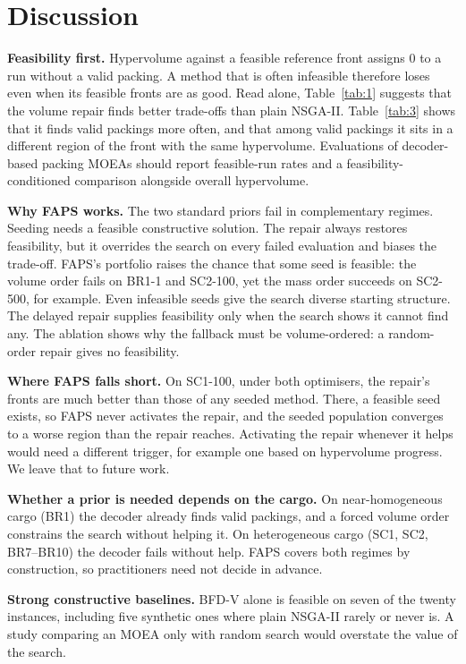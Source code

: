 \documentclass[journal]{IEEEtran}
\begin{document}
\section{Discussion}\label{sec:7}

\textbf{Feasibility first.} Hypervolume against a feasible reference front assigns 0 to a run without a valid packing. A method that is often infeasible therefore loses even when its feasible fronts are as good. Read alone, Table~\ref{tab:1} suggests that the volume repair finds better trade-offs than plain NSGA-II. Table~\ref{tab:3} shows that it finds valid packings more often, and that among valid packings it sits in a different region of the front with the same hypervolume. Evaluations of decoder-based packing MOEAs should report feasible-run rates and a feasibility-conditioned comparison alongside overall hypervolume.

\textbf{Why FAPS works.} The two standard priors fail in complementary regimes. Seeding needs a feasible constructive solution. The repair always restores feasibility, but it overrides the search on every failed evaluation and biases the trade-off. FAPS's portfolio raises the chance that some seed is feasible: the volume order fails on BR1-1 and SC2-100, yet the mass order succeeds on SC2-500, for example. Even infeasible seeds give the search diverse starting structure. The delayed repair supplies feasibility only when the search shows it cannot find any. The ablation shows why the fallback must be volume-ordered: a random-order repair gives no feasibility.

\textbf{Where FAPS falls short.} On SC1-100, under both optimisers, the repair's fronts are much better than those of any seeded method. There, a feasible seed exists, so FAPS never activates the repair, and the seeded population converges to a worse region than the repair reaches. Activating the repair whenever it helps would need a different trigger, for example one based on hypervolume progress. We leave that to future work.

\textbf{Whether a prior is needed depends on the cargo.} On near-homogeneous cargo (BR1) the decoder already finds valid packings, and a forced volume order constrains the search without helping it. On heterogeneous cargo (SC1, SC2, BR7--BR10) the decoder fails without help. FAPS covers both regimes by construction, so practitioners need not decide in advance.

\textbf{Strong constructive baselines.} BFD-V alone is feasible on seven of the twenty instances, including five synthetic ones where plain NSGA-II rarely or never is. A study comparing an MOEA only with random search would overstate the value of the search.
\end{document}
